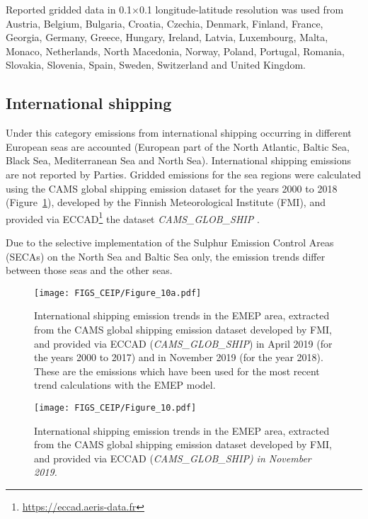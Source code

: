 Reported gridded data in 0.1{\degrees}$\times$0.1{\degrees} longitude-latitude resolution was used from Austria, Belgium, Bulgaria, Croatia, Czechia, Denmark, Finland, France, Georgia, Germany, Greece, Hungary, Ireland, Latvia, Luxembourg, Malta, Monaco, Netherlands, North Macedonia, Norway, Poland, Portugal, Romania, Slovakia, Slovenia, Spain, Sweden, Switzerland and United Kingdom.


\subsection{International shipping}

Under this category emissions from international shipping occurring in different European seas are accounted (European part of the North Atlantic, Baltic Sea, Black Sea, Mediterranean Sea and North Sea). International shipping emissions are not reported by Parties. Gridded emissions for the sea regions were
calculated using the CAMS global shipping emission dataset \citep{CAMSemis2019} for the years 2000 to 2018 (Figure~\ref{fig:CEIP10a}), developed by the Finnish Meteorological Institute (FMI), and provided via ECCAD\footnote{\url{https://eccad.aeris-data.fr}} the dataset {\it CAMS\_GLOB\_SHIP} \citep{ECCAD}.

Due to the selective implementation of the Sulphur Emission Control Areas (SECAs) on the North Sea and Baltic Sea only,
the emission trends differ between those seas and the other seas.


\begin{figure}[h]
\centering
{\texttt{[image: FIGS\_CEIP/Figure\_10a.pdf]}}
\caption{International shipping emission trends in the EMEP area, extracted from the CAMS global shipping emission dataset developed by FMI, and provided via ECCAD ({\it CAMS\_GLOB\_SHIP}) in April 2019 (for the years 2000 to 2017) and in November 2019 (for the year 2018). These are the emissions which have been used for the most recent trend calculations with the EMEP model.
}
\label{fig:CEIP10a}
\end{figure}

\begin{figure}[h]
\centering
{\texttt{[image: FIGS\_CEIP/Figure\_10.pdf]}}
\caption{International shipping emission trends in the EMEP area, extracted from the CAMS global shipping emission dataset developed by FMI, and provided via ECCAD (\it{CAMS\_GLOB\_SHIP}) in November 2019.}
\label{fig:CEIP10}
\end{figure}

